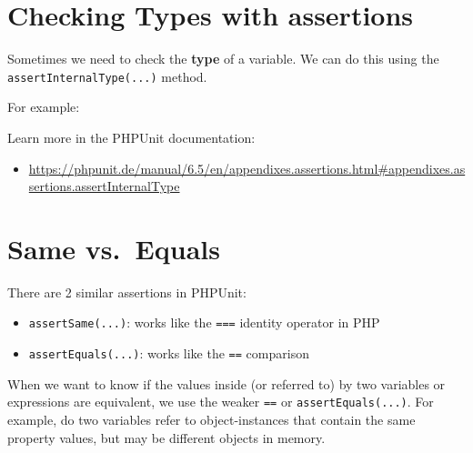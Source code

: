 \documentclass[a4paperpaper,openright]{book}
\newenvironment{Shaded}{}{}
\newcommand{\CommentTok}[1]{\textcolor[rgb]{0.38,0.63,0.69}{\textit{#1}}}
\newcommand{\DecValTok}[1]{\textcolor[rgb]{0.25,0.63,0.44}{#1}}
\newcommand{\KeywordTok}[1]{\textcolor[rgb]{0.00,0.44,0.13}{\textbf{#1}}}
\newcommand{\NormalTok}[1]{#1}
\newcommand{\OtherTok}[1]{\textcolor[rgb]{0.00,0.44,0.13}{#1}}
\newcommand{\StringTok}[1]{\textcolor[rgb]{0.25,0.44,0.63}{#1}}
\providecommand{\tightlist}{%
  \setlength{\itemsep}{0pt}\setlength{\parskip}{0pt}}
\begin{document}
\hypertarget{checking-types-with-assertions}{%
\section{Checking Types with
assertions}\label{checking-types-with-assertions}}

Sometimes we need to check the \textbf{type} of a variable. We can do
this using the \texttt{assertInternalType(...)} method.

For example:

\begin{Shaded}
\end{Shaded}

Learn more in the PHPUnit documentation:

\begin{itemize}
\tightlist
\item
  \url{https://phpunit.de/manual/6.5/en/appendixes.assertions.html\#appendixes.assertions.assertInternalType}
\end{itemize}

\hypertarget{same-vs.-equals}{%
\section{Same vs.~Equals}\label{same-vs.-equals}}

There are 2 similar assertions in PHPUnit:

\begin{itemize}
\tightlist
\item
  \texttt{assertSame(...)}: works like the \texttt{===} identity
  operator in PHP
\item
  \texttt{assertEquals(...)}: works like the \texttt{==} comparison
\end{itemize}

When we want to know if the values inside (or referred to) by two
variables or expressions are equivalent, we use the weaker \texttt{==}
or \texttt{assertEquals(...)}. For example, do two variables refer to
object-instances that contain the same property values, but may be
different objects in memory.
\end{document}
